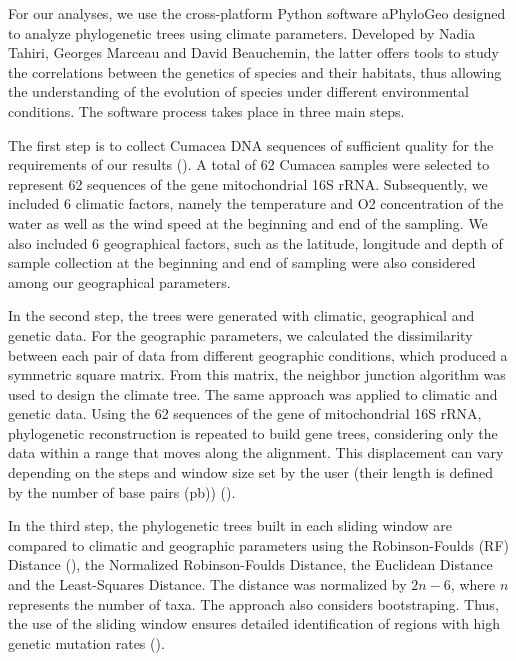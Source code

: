 For our analyses, we use the cross-platform Python software aPhyloGeo designed to analyze phylogenetic trees using climate parameters. Developed by Nadia Tahiri, Georges Marceau and David Beauchemin, the latter offers tools to study the correlations between the genetics of species and their habitats, thus allowing the understanding of the evolution of species under different environmental conditions. The software process takes place in three main steps. 

    The first step is to collect Cumacea DNA sequences of sufficient quality for the requirements of our results (\citep{koshkarov_phylogeography_2022}). A total of 62 Cumacea samples were selected to represent 62 sequences of the gene mitochondrial 16S rRNA. Subsequently, we included 6 climatic factors, namely the temperature and O2 concentration of the water as well as the wind speed at the beginning and end of the sampling. We also included 6 geographical factors, such as the latitude, longitude and depth of sample collection at the beginning and end of sampling were also considered among our geographical parameters.

    In the second step, the trees were generated with climatic, geographical and genetic data. For the geographic parameters, we calculated the dissimilarity between each pair of data from different geographic conditions, which produced a symmetric square matrix. From this matrix, the neighbor junction algorithm was used to design the climate tree. The same approach was applied to climatic and genetic data. Using the 62 sequences of the gene of mitochondrial 16S rRNA, phylogenetic reconstruction is repeated to build gene trees, considering only the data within a range that moves along the alignment. This displacement can vary depending on the steps and window size set by the user (their length is defined by the number of base pairs (pb)) (\citep{koshkarov_phylogeography_2022}).

    In the third step, the phylogenetic trees built in each sliding window are compared to climatic and geographic parameters using the Robinson-Foulds (RF) Distance (\citep{robinson_comparison_1981, koshkarov_phylogeography_2022}), the Normalized Robinson-Foulds Distance, the Euclidean Distance and the Least-Squares Distance. The distance was normalized by $2n-6$, where $n$ represents the number of taxa. The approach also considers bootstraping. Thus, the use of the sliding window ensures detailed identification of regions with high genetic mutation rates (\citep{koshkarov_phylogeography_2022}).

